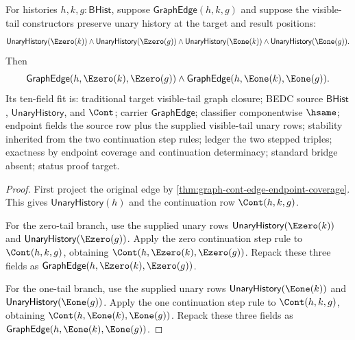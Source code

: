 \begin{theorem}
\label{thm:graph-cont-edge-visible-tail-step-closure}
For histories $h,k,g:\mathsf{BHist}$, suppose $\mathsf{GraphEdge}(h,k,g)$ and
suppose the visible-tail constructors preserve unary history at the target and
result positions:
$$
\mathsf{UnaryHistory}(\Ezero(k))\land
\mathsf{UnaryHistory}(\Ezero(g))\land
\mathsf{UnaryHistory}(\Eone(k))\land
\mathsf{UnaryHistory}(\Eone(g)).
$$
Then
$$
\mathsf{GraphEdge}(h,\Ezero(k),\Ezero(g))
\land
\mathsf{GraphEdge}(h,\Eone(k),\Eone(g)).
$$
Its ten-field fit is: traditional target visible-tail graph closure; BEDC
source $\mathsf{BHist}$, $\mathsf{UnaryHistory}$, and $\Cont$; carrier
$\mathsf{GraphEdge}$; classifier componentwise $\hsame$; endpoint fields the
source row plus the supplied visible-tail unary rows; stability inherited from
the two continuation step rules; ledger the two stepped triples; exactness by
endpoint coverage and continuation determinacy; standard bridge absent; status
proof target.
\end{theorem}
\begin{proof}
First project the original edge by
\autoref{thm:graph-cont-edge-endpoint-coverage}. This gives
$\mathsf{UnaryHistory}(h)$ and the continuation row $\Cont(h,k,g)$.

For the zero-tail branch, use the supplied unary rows
$\mathsf{UnaryHistory}(\Ezero(k))$ and $\mathsf{UnaryHistory}(\Ezero(g))$.
Apply the zero continuation step rule to $\Cont(h,k,g)$, obtaining
$\Cont(h,\Ezero(k),\Ezero(g))$. Repack these three fields as
$\mathsf{GraphEdge}(h,\Ezero(k),\Ezero(g))$.

For the one-tail branch, use the supplied unary rows
$\mathsf{UnaryHistory}(\Eone(k))$ and $\mathsf{UnaryHistory}(\Eone(g))$.
Apply the one continuation step rule to $\Cont(h,k,g)$, obtaining
$\Cont(h,\Eone(k),\Eone(g))$. Repack these three fields as
$\mathsf{GraphEdge}(h,\Eone(k),\Eone(g))$.
\end{proof}

